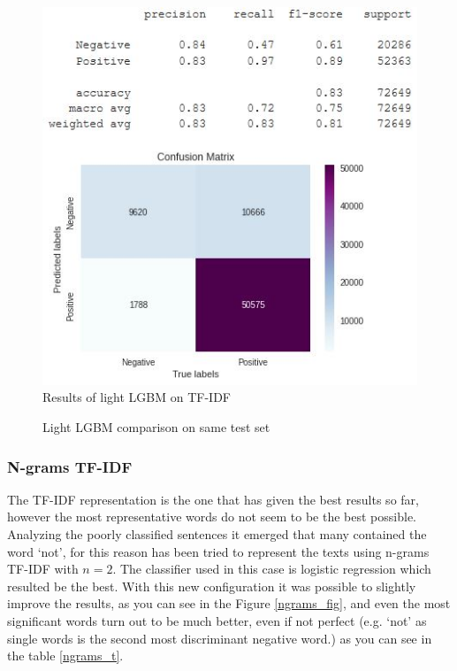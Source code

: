 \documentclass[11pt]{article}
\begin{document}
\begin{figure}[H]
\begin{minipage}[b]{0.48\textwidth}
		\includegraphics[width=\textwidth]{light_tfidf.JPG}
		{Results of light LGBM on TF-IDF}
	\end{minipage}
	\caption{Light LGBM comparison on same test set}
	\label{light_fig}
\end{figure}

\subsubsection{N-grams TF-IDF}
The TF-IDF representation is the one that has given the best results so far, however the most representative words do not seem to be the best possible. Analyzing the poorly classified sentences it emerged that many contained the word `not', for this reason has been tried to represent the texts using n-grams TF-IDF with $n = 2$. The classifier used in this case is logistic regression which resulted be the best. With this new configuration it was possible to slightly improve the results, as you can see in the Figure \ref{ngrams_fig}, and even the most significant words turn out to be much better, even if not perfect (e.g. `not' as single words is the second most discriminant negative word.) as you can see in the table \ref{ngrams_t}.
\end{document}
